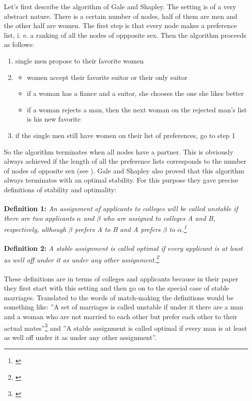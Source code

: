 \documentclass[11pt]{article}
\begin{document}
Let's first describe the algorithm of Gale and Shapley. The setting is of a very abstract nature. There is a certain number of nodes, half of
them are men and the other half are women. The first step is that every node makes a preference list, i. e. a ranking of all the nodes of oppposite
sex. Then the algorithm proceeds as follows:
\begin{enumerate}
  \item single men propose to their favorite women
  \item
  \begin{itemize}
    \item women accept their favorite suitor or their only suitor
    \item if a woman has a fiance and a suitor, she chooses the one she likes better
    \item if a woman rejects a man, then the next woman on the rejected man's list is his new favorite
  \end{itemize}
  \item if the single men still have women on their list of preferences, go to step 1
\end{enumerate}
So the algorithm terminates when all nodes have a partner. This is obviously always achieved if the length of all the preference lists
corresponds to the number of nodes of opposite sex (see \citet[p. 14, Theorem 1]{1962}).
Gale and Shapley also proved that this algorithm always terminates with an optimal stability. For this purpose they gave precise definitions
of stability and optimality:
\\
\\
\textbf{Definition 1: }\textit{An assignment of applicants to colleges will be called unstable if there are two applicants
 $\alpha$ and $\beta$ who are assigned to colleges A and B, respectively, although $\beta$ prefers A to B and A prefers $\beta$
  to $\alpha$.\footnote{\citet[p. 10]{1962}}}
\label{eq:stable}
\\
\\
\textbf{Definition 2: }\textit{A stable assignment is called optimal if every applicant is at
least as well off under it as under any other assignment.\footnote{\citet[p. 10]{1962}}}
\label{eq:optimal}
\\
\\
These definitions are in terms of colleges and applicants because in their paper they first start with this setting and then go on to the
special case of stable marriages. Translated to the words of match-making the definitions would be something like: ''A set of marriages is called
unstable if under it there are a man and a woman who are not married to each other but prefer each other to their actual mates''\footnote{\citet[p. 11]{1962}}
and ''A stable assignment is called optimal if every man is at least as well off under it as under any other assignment''. 
\end{document}
